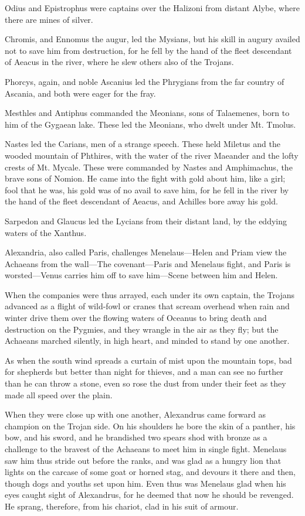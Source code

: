 Odius and Epistrophus were captains over the Halizoni from distant Alybe,
where there are mines of silver.

Chromis, and Ennomus the augur, led the Mysians, but his skill in augury
availed not to save him from destruction, for he fell by the hand of the
fleet descendant of Aeacus in the river, where he slew others also of the
Trojans.

Phorcys, again, and noble Ascanius led the Phrygians from the far country
of Ascania, and both were eager for the fray.

Mesthles and Antiphus commanded the Meonians, sons of Talaemenes, born to
him of the Gygaean lake. These led the Meonians, who dwelt under Mt.
Tmolus.

Nastes led the Carians, men of a strange speech. These held Miletus and
the wooded mountain of Phthires, with the water of the river Maeander and
the lofty crests of Mt. Mycale. These were commanded by Nastes and
Amphimachus, the brave sons of Nomion. He came into the fight with gold
about him, like a girl; fool that he was, his gold was of no avail to save
him, for he fell in the river by the hand of the fleet descendant of
Aeacus, and Achilles bore away his gold.

Sarpedon and Glaucus led the Lycians from their distant land, by the
eddying waters of the Xanthus.


Alexandria, also called Paris, challenges Menelaus—Helen and Priam
view the Achaeans from the wall—The covenant—Paris and
Menelaus fight, and Paris is worsted—Venus carries him off to save
him—Scene between him and Helen.

When the companies were thus arrayed, each under its own captain, the
Trojans advanced as a flight of wild-fowl or cranes that scream overhead
when rain and winter drive them over the flowing waters of Oceanus to
bring death and destruction on the Pygmies, and they wrangle in the air as
they fly; but the Achaeans marched silently, in high heart, and minded to
stand by one another.

As when the south wind spreads a curtain of mist upon the mountain tops,
bad for shepherds but better than night for thieves, and a man can see no
further than he can throw a stone, even so rose the dust from under their
feet as they made all speed over the plain.

When they were close up with one another, Alexandrus came forward as
champion on the Trojan side. On his shoulders he bore the skin of a
panther, his bow, and his sword, and he brandished two spears shod with
bronze as a challenge to the bravest of the Achaeans to meet him in single
fight. Menelaus saw him thus stride out before the ranks, and was glad as
a hungry lion that lights on the carcase of some goat or horned stag, and
devours it there and then, though dogs and youths set upon him. Even thus
was Menelaus glad when his eyes caught sight of Alexandrus, for he deemed
that now he should be revenged. He sprang, therefore, from his chariot,
clad in his suit of armour.


